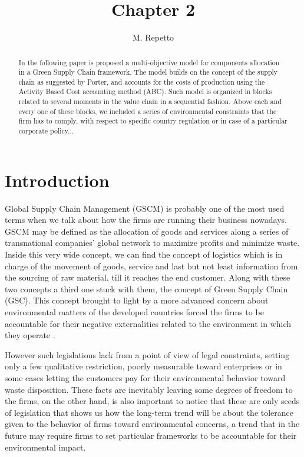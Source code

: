 \documentclass{article}
\begin{document}
\title{Chapter 2}

\author{M. Repetto}

\date{}

\maketitle

\begin{abstract}
In the following paper is proposed a multi-objective model for components allocation in a Green Supply Chain framework. The model builds on the concept of the supply chain as suggested by Porter, and accounts for the costs of production using the Activity Based Cost accounting method (ABC). Such model is organized in blocks related to several moments in the value chain in a sequential fashion. Above each and every one of these blocks, we included a series of environmental constraints that the firm has to comply, with respect to specific country regulation or in case of a particular corporate policy...
\end{abstract}

\section{Introduction}
Global Supply Chain Management (GSCM) is probably one of the most used terms when we talk about how the firms are running their business nowadays. GSCM may be defined as the allocation of goods and services along a series of transnational companies' global network to maximize profits and minimize waste. Inside this very wide concept, we can find the concept of logistics which is in charge of the movement of goods, service and last but not least information from the sourcing of raw material, till it reaches the end customer.
Along with these two concepts a third one stuck with them, the concept of Green Supply Chain (GSC). This concept brought to light by a more advanced concern about environmental matters of the developed countries forced the firms to be accountable for their negative externalities related to the environment in which they operate \cite{srivastava_green_2007}.

However such legislations lack from a point of view of legal constraints, setting only a few qualitative restriction, poorly measurable toward enterprises or in some cases letting the customers pay for their environmental behavior toward waste disposition. These facts are inevitably leaving some degrees of freedom to the firms, on the other hand, is also important to notice that these are only seeds of legislation that shows us how the long-term trend will be about the tolerance given to the behavior of firms toward environmental concerns, a trend that in the future may require firms to set particular frameworks to be accountable for their environmental impact.
\end{document}
